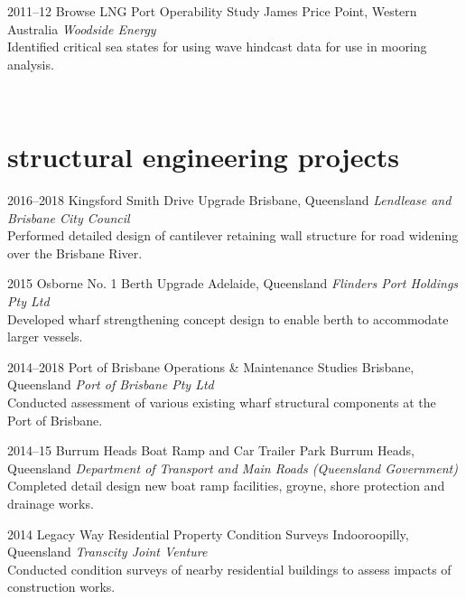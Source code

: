 \begin{entrylist}
\entry%
{2011--12}
{Browse LNG Port Operability Study}
{James Price Point, Western Australia}
{\emph{Woodside Energy} \\
Identified critical sea states for using wave hindcast data for use in mooring analysis.}
\end{entrylist}
\\


\section{structural engineering projects}

\begin{entrylist}
\entry%
{2016--2018}
{Kingsford Smith Drive Upgrade}
{Brisbane, Queensland}
{\emph{Lendlease and Brisbane City Council} \\
Performed detailed design of cantilever retaining wall structure for road widening over the Brisbane River.}
\end{entrylist}

\begin{entrylist}
\entry%
{2015}
{Osborne No. 1 Berth Upgrade}
{Adelaide, Queensland}
{\emph{Flinders Port Holdings Pty Ltd} \\
Developed wharf strengthening concept design to enable berth to accommodate larger vessels.}
\end{entrylist}

\begin{entrylist}
\entry%
{2014--2018}
{Port of Brisbane Operations \& Maintenance Studies}
{Brisbane, Queensland}
{\emph{Port of Brisbane Pty Ltd} \\
Conducted assessment of various existing wharf structural components at the Port of Brisbane.}
\end{entrylist}

\begin{entrylist}
\entry%
{2014--15}
{Burrum Heads Boat Ramp and Car Trailer Park}
{Burrum Heads, Queensland}
{\emph{Department of Transport and Main Roads (Queensland Government)} \\
Completed detail design new boat ramp facilities, groyne, shore protection and drainage works.}
\end{entrylist}

\begin{entrylist}
\entry%
{2014}
{Legacy Way Residential Property Condition Surveys}
{Indooroopilly, Queensland}
{\emph{Transcity Joint Venture} \\
Conducted condition surveys of nearby residential buildings to assess impacts of construction works.}
\end{entrylist}


